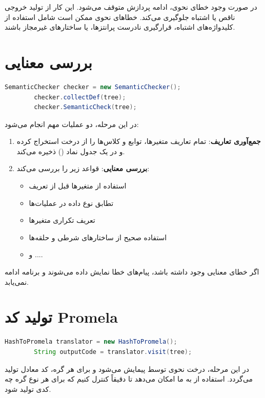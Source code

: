 \documentclass[12pt]{report}
\begin{document}
	در صورت وجود خطای نحوی، ادامه پردازش متوقف می‌شود. این کار از تولید خروجی ناقص یا اشتباه جلوگیری می‌کند. خطاهای نحوی ممکن است شامل استفاده از کلیدواژه‌های اشتباه، قرارگیری نادرست پرانتزها، یا ساختارهای غیرمجاز باشند.
	
	\section{بررسی معنایی}
	
	\setLTR
	\begin{lstlisting}[language=Java]
		SemanticChecker checker = new SemanticChecker();
		checker.collectDef(tree);
		checker.SemanticCheck(tree);
	\end{lstlisting}
	\setRTL
	
	در این مرحله، دو عملیات مهم انجام می‌شود:
	
	\begin{enumerate}
		\item \textbf{جمع‌آوری تعاریف}:  تمام تعاریف متغیرها، توابع و کلاس‌ها را از درخت استخراج کرده و در یک جدول نماد () ذخیره می‌کند.
		\item \textbf{بررسی معنایی}:  قواعد زیر را بررسی می‌کند:
		\begin{itemize}
			\item استفاده از متغیرها قبل از تعریف
			\item تطابق نوع داده در عملیات‌ها
			\item تعریف تکراری متغیرها
			\item استفاده صحیح از ساختارهای شرطی و حلقه‌ها
			\item و ....
		\end{itemize}
	\end{enumerate}
	
	اگر خطای معنایی وجود داشته باشد، پیام‌های خطا نمایش داده می‌شوند و برنامه ادامه نمی‌یابد.
	
	\section{تولید کد Promela}
	
	\setLTR
	\begin{lstlisting}[language=Java]
		HashToPromela translator = new HashToPromela();
		String outputCode = translator.visit(tree);
	\end{lstlisting}
	\setRTL
	
	در این مرحله، درخت نحوی توسط  پیمایش می‌شود و برای هر گره، کد معادل  تولید می‌گردد. استفاده از  به ما امکان می‌دهد تا دقیقاً کنترل کنیم که برای هر نوع گره چه کدی تولید شود.
	
\end{document}
